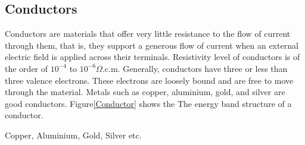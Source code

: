 \subsection{Conductors}
Conductors are materials that offer very little ­resistance to the flow of current through them, that is, they ­support a generous flow of current when an external electric field is applied across their terminals. Resistivity level of con­ductors is of the order of $10^{-4}$ to $10^{-6} \Omega. \text{c.m}$. Generally, conductors have three or less than three valence ­electrons. These electrons are loosely bound and are free to move through the material. Metals such as copper, ­aluminium, gold, and silver are good conductors. Figure\ref{Conductor} shows the The energy band structure of a conductor.
\begin{example}
Copper, Aluminium, Gold, Silver etc.
\end{example}
